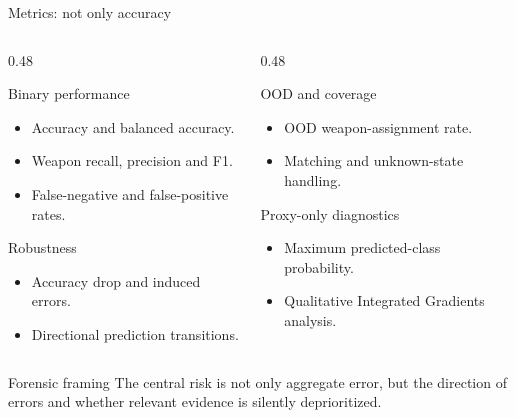 \documentclass{beamer}
\begin{document}
\begin{frame}[shrink=2]{Metrics: not only accuracy}
\small
\begin{columns}
\begin{column}{0.48\textwidth}
\begin{block}{Binary performance}
\begin{itemize}
    \item Accuracy and balanced accuracy.
    \item Weapon recall, precision and F1.
    \item False-negative and false-positive rates.
\end{itemize}
\end{block}
\begin{block}{Robustness}
\begin{itemize}
    \item Accuracy drop and induced errors.
    \item Directional prediction transitions.
\end{itemize}
\end{block}
\end{column}
\begin{column}{0.48\textwidth}
\begin{block}{OOD and coverage}
\begin{itemize}
    \item OOD weapon-assignment rate.
    \item Matching and unknown-state handling.
\end{itemize}
\end{block}
\begin{block}{Proxy-only diagnostics}
\begin{itemize}
    \item Maximum predicted-class probability.
    \item Qualitative Integrated Gradients analysis.
\end{itemize}
\end{block}
\end{column}
\end{columns}

\begin{block}{Forensic framing}
The central risk is not only aggregate error, but the direction of errors and whether relevant evidence is silently deprioritized.
\end{block}
\end{frame}

\end{document}
